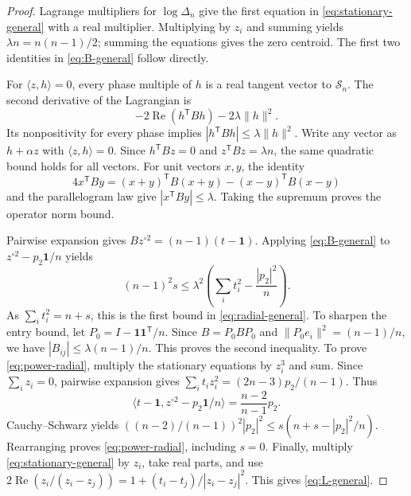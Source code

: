 \documentclass[11pt]{article}
\theoremstyle{remark}
\newcommand{\one}{\mathbf 1}
\newcommand{\norm}[1]{\lVert#1\rVert}
\newcommand{\ip}[2]{\langle#1,#2\rangle}
\newcommand{\Rea}{\operatorname{Re}}
\numberwithin{equation}{section}
\begin{document}
\begin{proof}
Lagrange multipliers for $\log\Delta_n$ give the first equation
in \eqref{eq:stationary-general} with a real multiplier.
Multiplying by $z_i$ and summing yields
$\lambda n=n(n-1)/2$; summing the equations gives the zero centroid.
The first two identities in \eqref{eq:B-general} follow directly.

For $\ip{z}{h}=0$, every phase multiple of $h$ is a real tangent vector
to $\mathcal S_n$. The second derivative of the Lagrangian is
\[
 -2\Rea(h^{\mathsf T}Bh)-2\lambda\norm{h}^2.
\]
Its nonpositivity for every phase implies
$|h^{\mathsf T}Bh|\le\lambda\norm h^2$.
Write any vector as $h+\alpha z$ with $\ip z h=0$.
Since $h^{\mathsf T}Bz=0$ and $z^{\mathsf T}Bz=\lambda n$,
the same quadratic bound holds for all vectors.
For unit vectors $x,y$, the identity
\[
4x^{\mathsf T}By=(x+y)^{\mathsf T}B(x+y)
 -(x-y)^{\mathsf T}B(x-y)
\]
and the parallelogram law give $|x^{\mathsf T}By|\le\lambda$.
Taking the supremum proves the operator norm bound.

Pairwise expansion gives
$Bz^{\circ2}=(n-1)(t-\one)$. Applying \eqref{eq:B-general} to
$z^{\circ2}-p_2\one/n$ yields
\[
 (n-1)^2s\le\lambda^2
 \left(\sum_i t_i^2-\frac{|p_2|^2}{n}\right).
\]
As $\sum_i t_i^2=n+s$, this is the first bound in
\eqref{eq:radial-general}. To sharpen the entry bound, let
$P_0=I-\one\one^{\mathsf T}/n$. Since $B=P_0BP_0$ and
$\norm{P_0e_i}^2=(n-1)/n$, we have
$|B_{ij}|\le\lambda(n-1)/n$.
This proves the second inequality.
To prove \eqref{eq:power-radial}, multiply the stationary equations
by $z_i^3$ and sum. Since $\sum_i z_i=0$, pairwise expansion gives
$\sum_i t_i z_i^2=(2n-3)p_2/(n-1)$. Thus
\[
 \ip{t-\one}{z^{\circ2}-p_2\one/n}
   =\frac{n-2}{n-1}p_2.
\]
Cauchy--Schwarz yields
$((n-2)/(n-1))^2|p_2|^2
 \le s(n+s-|p_2|^2/n)$.
Rearranging proves \eqref{eq:power-radial}, including $s=0$.
Finally, multiply \eqref{eq:stationary-general} by $z_i$, take real
parts, and use
$2\Rea(z_i/(z_i-z_j))=1+(t_i-t_j)/|z_i-z_j|^2$.
This gives \eqref{eq:L-general}.
\end{proof}
\end{document}
